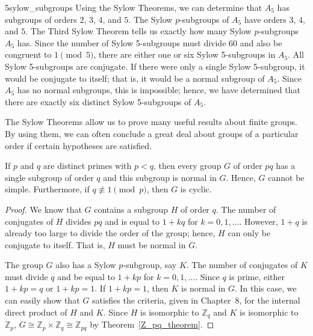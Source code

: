  
\begin{example}{5sylow_subgroups}
Using the Sylow Theorems, we can determine that $A_5$ has subgroups of
orders $2$, $3$, $4$, and $5$. The Sylow $p$-subgroups of $A_5$ have
orders $3$, $4$, and $5$. The Third Sylow Theorem tells us exactly how
many Sylow $p$-subgroups $A_5$ has. Since the number of Sylow 
5-subgroups must divide 60 and also be congruent to $1 \pmod{5}$,
there are either one or six Sylow 5-subgroups in $A_5$. All Sylow
5-subgroups are conjugate.  If there were only a single Sylow 
5-subgroup, it would be conjugate to itself; that is, it would be a
normal subgroup of $A_5$. Since $A_5$ has no normal subgroups, this is 
impossible; hence, we have determined that there are exactly six
distinct Sylow 5-subgroups of $A_5$. 
\end{example}
 
 
The Sylow Theorems allow us to prove many useful results about finite
groups. By using them, we can often conclude a great deal about groups 
of a particular order if certain hypotheses are satisfied.
 
 
\begin{theorem}\label{sylow:pq_cyclic_theorem}
If $p$ and $q$ are distinct primes with $p<q$, then every group $G$ of
order $pq$ has a single subgroup of order $q$ and this subgroup is
normal in $G$.  Hence, $G$ cannot be simple.  Furthermore, if $q
\not\equiv 1 \pmod{p}$, then $G$ is cyclic.
\end{theorem}
 
 
\begin{proof}
We know that $G$ contains a subgroup $H$ of order $q$. The number of
conjugates of $H$  divides $pq$ and is equal to $1 +kq$ for $k = 0, 1,
\ldots$. However, $1+q$ is already too large to divide the order of
the group; hence, $H$ can only be conjugate to itself.  That is, $H$
must be normal in $G$. 
 
 
The group $G$ also has a Sylow $p$-subgroup, say $K$. The number of
conjugates of $K$ must divide $q$ and be equal to $1 + kp$ for $k = 0,
1, \ldots$. Since $q$ is prime, either $1 +kp=q$ or $1+kp =1$. If $1
+kp=1$, then $K$ is normal in $G$. In this case, we can easily show
that $G$ satisfies the criteria, given in Chapter~8, for the
internal direct product of $H$ and $K$.  Since $H$ is isomorphic to
${\mathbb Z}_q$ and $K$ is isomorphic to ${\mathbb Z}_p$, $G \cong {\mathbb
Z}_p \times {\mathbb Z}_q  \cong {\mathbb Z}_{pq}$ by Theorem~\ref{Z_pq_theorem}. 
\mbox{\hspace*{1in}}
\end{proof}
 
